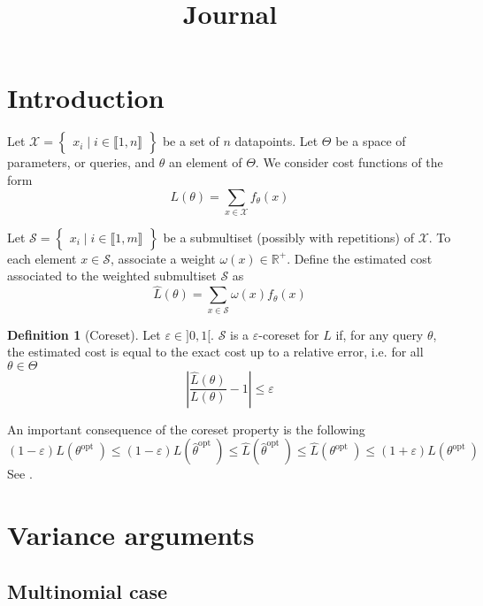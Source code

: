 \documentclass{article} %
\title{Journal}
\renewcommand{\epsilon}{\varepsilon}
\newcommand{\1}{\mathds{1}} %
\newcommand{\intint}[2]{\llbracket #1,#2 \rrbracket} %
\theoremstyle{definition} %
\newtheorem{definition}{Definition}[section]
\begin{document}
	
	\maketitle
	
	\section{Introduction}
	
	Let $\mathcal{X}=\begin{Bmatrix}
		x_{i} \mid i\in \intint{1}{n}
	\end{Bmatrix}$ be a set of $n$ datapoints. Let $\Theta$ be a space of parameters, or queries, and $\theta$ an element of $\Theta$. We consider cost functions of the form
	$$
	L(\theta)=\sum_{x \in \mathcal{X}} f_\theta(x)
	$$
	
	Let $\mathcal{S}=\begin{Bmatrix}
		x_{i} \mid i\in \intint{1}{m}
	\end{Bmatrix}$ be a submultiset (possibly with repetitions) of $\mathcal{X}$. To each element $x \in \mathcal{S}$, associate a weight $\omega\left(x\right) \in \mathbb{R}^{+}$. Define the estimated cost associated to the weighted submultiset $\mathcal{S}$ as
	$$
	\hat{L}(\theta)=\sum_{x \in \mathcal{S}} \omega\left(x\right) f_\theta(x)
	$$
	\begin{definition}[Coreset]
			Let $\epsilon \in {]}0,1{[}$. $\mathcal{S}$ is a $\epsilon$-coreset for $L$ if, for any query $\theta$, the estimated cost is equal to the exact cost up to a relative error, i.e. for all $\theta \in \Theta$
		\begin{equation}
			\left|\frac{\hat{L}(\theta)}{L(\theta)}-1\right| \le \epsilon 
		\label{coresetprop}
		\end{equation}
	\end{definition}
An important consequence of the coreset property is the following
\begin{equation}
	(1-\epsilon) L(\theta^{\text {opt }}) \le(1-\epsilon) L( \hat{\theta}^{\text {opt }}) \le \hat{L}( \hat{\theta}^{\text {opt }}) \le \hat{L}( \theta^{\text {opt }}) \le(1+\epsilon) L( \theta^{\text {opt }})
\end{equation}
See \cite{bachem2017coresetML}.

\section{Variance arguments}
\subsection{Multinomial case}
\end{document}
